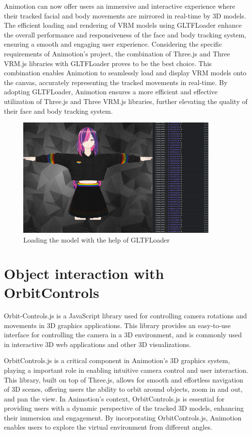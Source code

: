 Animotion can now offer users an immersive and 
interactive experience where their tracked facial and body movements are mirrored in real-time by 3D models. 
The efficient loading and rendering of VRM models using GLTFLoader enhance the overall performance and 
responsiveness of the face and body tracking system, ensuring a smooth and engaging user experience.
Considering the specific requirements of Animotion's project, the combination of Three.js and Three VRM.js 
libraries with GLTFLoader proves to be the best choice. This combination enables Animotion to seamlessly 
load and display VRM models onto the canvas, accurately representing the tracked movements in real-time. 
By adopting GLTFLoader, Animotion ensures a more efficient and effective utilization of Three.js 
and Three VRM.js libraries, further elevating the quality of their face and body tracking system.
\\
\begin{figure}[htb]
    \centering
    \includegraphics[width=0.9\textwidth]{pics/GLTFLoader.png}
    \caption{Loading the model with the help of GLTFLoader}
    \label{fig:gltfloader}
\end{figure}
\newpage
\section{Object interaction with OrbitControls}
\author{Romeo Bhuiyan}
Orbit-Controls.js is a JavaScript library used for controlling camera rotations 
and movements in 3D graphics applications. This library provides an easy-to-use 
interface for controlling the camera in a 3D environment, and is commonly used in 
interactive 3D web applications and other 3D visualizations.

OrbitControls.js is a critical component in Animotion's 3D graphics system, playing a important role in 
enabling intuitive camera control and user interaction. This library, built on top of Three.js, allows 
for smooth and effortless navigation of 3D scenes, offering users the ability to orbit around objects, zoom in and out, and pan the view.
In Animotion's context, OrbitControls.js is essential for providing users with a dynamic perspective of the tracked 3D models, 
enhancing their immersion and engagement. By incorporating OrbitControls.js, 
Animotion enables users to explore the virtual environment from different angles.


